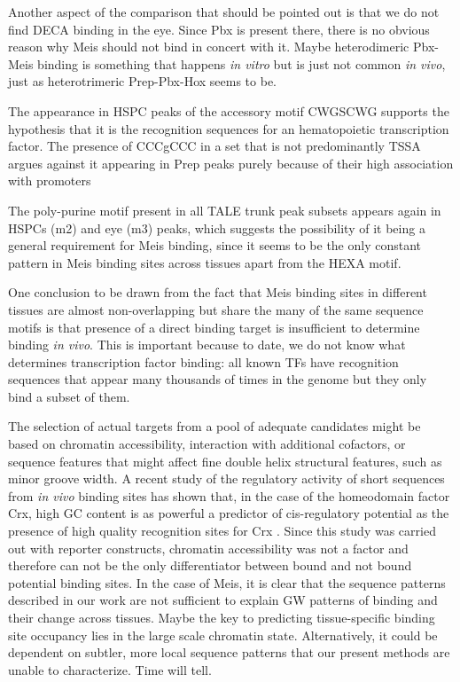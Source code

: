 
Another aspect of the comparison that should be pointed out is that we do not find \ac{DECA} binding in the eye. Since Pbx is present there, there is no obvious reason why Meis should not bind in concert with it. Maybe heterodimeric Pbx-Meis binding is something that happens \textit{in vitro} but is just not common \textit{in vivo}, just as heterotrimeric Prep-Pbx-Hox seems to be.

The appearance in \ac{HSPC} peaks of the accessory motif  CWGSCWG supports the hypothesis that it is the recognition sequences for an hematopoietic transcription factor. The presence of CCCgCCC in a set that is not predominantly \ac{TSSA} argues against it appearing in Prep peaks purely because of their high association with promoters

The poly-purine motif present in all \ac{TALE} trunk peak subsets appears again in \acp{HSPC} (m2) and eye (m3) peaks, which suggests the possibility of it being a general requirement for Meis binding, since it seems to be the only constant pattern in Meis binding sites across tissues apart from the \ac{HEXA} motif. 

One conclusion to be drawn from the fact that Meis binding sites in different tissues are almost non-overlapping but share the many of the same sequence motifs is that presence of a direct binding target is insufficient to determine binding \textit{in vivo}. This is important because to date, we do not know what determines transcription factor binding: all known \acp{TF} have recognition sequences that appear many thousands of times in the genome but they only bind a subset of them.

The selection of actual targets from a pool of adequate candidates might be based on chromatin accessibility, interaction with additional cofactors, or sequence features that might affect fine double helix structural features, such as minor groove width. A recent study of the regulatory activity of short sequences from \textit{in vivo} binding sites has shown that, in the case of the homeodomain factor Crx, high GC content is as powerful a predictor of cis-regulatory potential as the presence of high quality recognition sites for Crx \parencite{White2013}. Since this study was carried out with reporter constructs, chromatin accessibility was not a factor and therefore can not be the only differentiator between bound and not bound potential binding sites. In the case of Meis, it is clear that the sequence patterns described in our work are not sufficient to explain \ac{GW} patterns of binding and their change across tissues. Maybe the key to predicting tissue-specific binding site occupancy lies in the large scale chromatin state. Alternatively, it could be dependent on subtler, more local sequence patterns that our present methods are unable to characterize. Time will tell.

